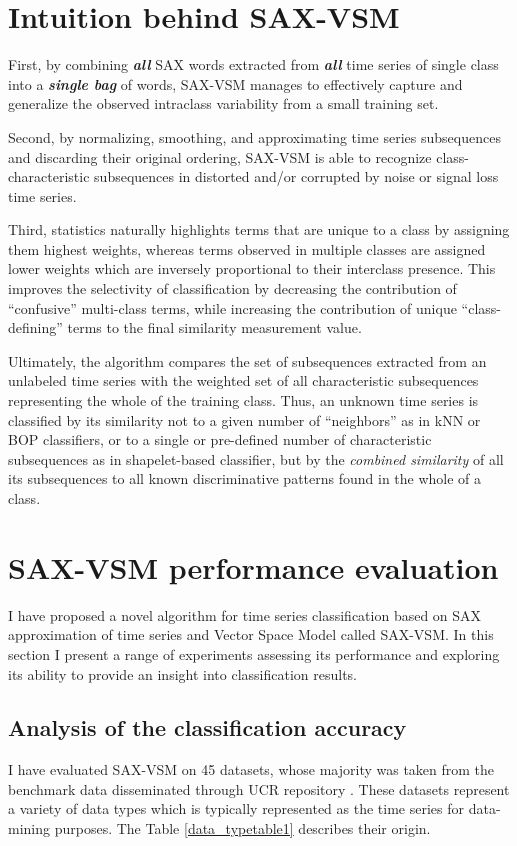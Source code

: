 \section{Intuition behind SAX-VSM}
First, by combining \textit{\textbf{all}} SAX words extracted from 
\textit{\textbf{all}} time series of single class into a \textit{\textbf{single bag}} of 
words, SAX-VSM manages to effectively capture and generalize the observed intraclass variability 
from a small training set.  

Second, by normalizing, smoothing, and approximating time series subsequences and discarding their 
original ordering, SAX-VSM is able to recognize class-characteristic subsequences in distorted and/or corrupted 
by noise or signal loss time series. 

Third,  \tfidf statistics naturally highlights terms that are unique to a class by assigning them highest weights, 
whereas terms observed in multiple classes are assigned lower weights which are inversely proportional to 
their interclass presence. 
This improves the selectivity of classification by decreasing the contribution of ``confusive'' multi-class terms, 
while increasing the contribution of unique ``class-defining'' terms to the final similarity measurement value.

Ultimately, the algorithm compares the set of subsequences extracted from an unlabeled time series 
with the weighted set of all characteristic subsequences representing the whole of the training class. 
Thus, an unknown time series is classified by its similarity not to a given number of 
``neighbors'' as in kNN or BOP classifiers, or to a single or pre-defined number of characteristic subsequences 
as in shapelet-based classifier, but by the \textit{combined similarity} of all its subsequences to all known 
discriminative patterns found in the whole of a class.

\section{SAX-VSM performance evaluation} \label{results}
I have proposed a novel algorithm for time series classification based on SAX approximation of time series and 
Vector Space Model called SAX-VSM. In this section I present a range of experiments assessing its performance 
and exploring its ability to provide an insight into classification results.

\subsection{Analysis of the classification accuracy}
I have evaluated SAX-VSM on 45 datasets, whose majority was taken from the benchmark data disseminated 
through UCR repository \cite{ucr}. These datasets represent a variety of data types which is typically represented 
as the time series for data-mining purposes. The Table \ref{data_typetable1} describes their origin.

